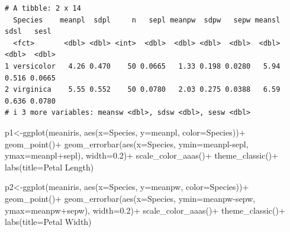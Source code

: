 \documentclass[
  letterpaper,
  DIV=11,
  numbers=noendperiod]{scrartcl}
\newenvironment{Shaded}{\begin{snugshade}}{\end{snugshade}}
\newcommand{\AttributeTok}[1]{\textcolor[rgb]{0.40,0.45,0.13}{#1}}
\newcommand{\FloatTok}[1]{\textcolor[rgb]{0.68,0.00,0.00}{#1}}
\newcommand{\FunctionTok}[1]{\textcolor[rgb]{0.28,0.35,0.67}{#1}}
\newcommand{\NormalTok}[1]{\textcolor[rgb]{0.00,0.23,0.31}{#1}}
\newcommand{\OtherTok}[1]{\textcolor[rgb]{0.00,0.23,0.31}{#1}}
\newcommand{\SpecialCharTok}[1]{\textcolor[rgb]{0.37,0.37,0.37}{#1}}
\newcommand{\StringTok}[1]{\textcolor[rgb]{0.13,0.47,0.30}{#1}}
\begin{document}
\begin{verbatim}
# A tibble: 2 x 14
  Species    meanpl  sdpl     n   sepl meanpw  sdpw   sepw meansl  sdsl   sesl
  <fct>       <dbl> <dbl> <int>  <dbl>  <dbl> <dbl>  <dbl>  <dbl> <dbl>  <dbl>
1 versicolor   4.26 0.470    50 0.0665   1.33 0.198 0.0280   5.94 0.516 0.0665
2 virginica    5.55 0.552    50 0.0780   2.03 0.275 0.0388   6.59 0.636 0.0780
# i 3 more variables: meansw <dbl>, sdsw <dbl>, sesw <dbl>
\end{verbatim}

\hfill\break

\begin{Shaded}
\begin{Highlighting}[]
\NormalTok{p1}\OtherTok{\textless{}{-}}\FunctionTok{ggplot}\NormalTok{(meaniris, }\FunctionTok{aes}\NormalTok{(}\AttributeTok{x=}\NormalTok{Species, }\AttributeTok{y=}\NormalTok{meanpl, }\AttributeTok{color=}\NormalTok{Species))}\SpecialCharTok{+}
  \FunctionTok{geom\_point}\NormalTok{()}\SpecialCharTok{+}
  \FunctionTok{geom\_errorbar}\NormalTok{(}\FunctionTok{aes}\NormalTok{(}\AttributeTok{x=}\NormalTok{Species, }\AttributeTok{ymin=}\NormalTok{meanpl}\SpecialCharTok{{-}}\NormalTok{sepl, }\AttributeTok{ymax=}\NormalTok{meanpl}\SpecialCharTok{+}\NormalTok{sepl), }\AttributeTok{width=}\FloatTok{0.2}\NormalTok{)}\SpecialCharTok{+}
  \FunctionTok{scale\_color\_aaas}\NormalTok{()}\SpecialCharTok{+}
  \FunctionTok{theme\_classic}\NormalTok{()}\SpecialCharTok{+}
  \FunctionTok{labs}\NormalTok{(}\AttributeTok{title=}\StringTok{\textquotesingle{}Petal Length\textquotesingle{}}\NormalTok{)}

\NormalTok{p2}\OtherTok{\textless{}{-}}\FunctionTok{ggplot}\NormalTok{(meaniris, }\FunctionTok{aes}\NormalTok{(}\AttributeTok{x=}\NormalTok{Species, }\AttributeTok{y=}\NormalTok{meanpw, }\AttributeTok{color=}\NormalTok{Species))}\SpecialCharTok{+}
  \FunctionTok{geom\_point}\NormalTok{()}\SpecialCharTok{+}
  \FunctionTok{geom\_errorbar}\NormalTok{(}\FunctionTok{aes}\NormalTok{(}\AttributeTok{x=}\NormalTok{Species, }\AttributeTok{ymin=}\NormalTok{meanpw}\SpecialCharTok{{-}}\NormalTok{sepw, }\AttributeTok{ymax=}\NormalTok{meanpw}\SpecialCharTok{+}\NormalTok{sepw), }\AttributeTok{width=}\FloatTok{0.2}\NormalTok{)}\SpecialCharTok{+}
  \FunctionTok{scale\_color\_aaas}\NormalTok{()}\SpecialCharTok{+}
  \FunctionTok{theme\_classic}\NormalTok{()}\SpecialCharTok{+}
  \FunctionTok{labs}\NormalTok{(}\AttributeTok{title=}\StringTok{\textquotesingle{}Petal Width\textquotesingle{}}\NormalTok{)}


\end{Highlighting}
\end{Shaded}
\end{document}
